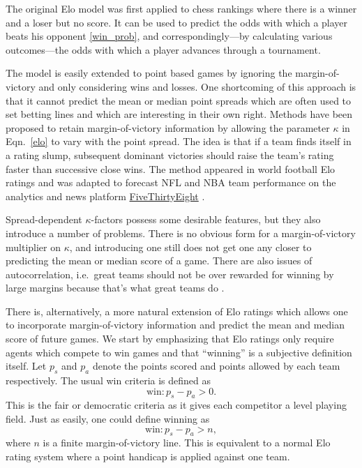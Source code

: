 \documentclass[aps,prc,reprint,amsmath,superscriptaddress]{revtex4-1}
\begin{document}
The original Elo model was first applied to chess rankings where there is a winner and a loser but no score.
It can be used to predict the odds with which a player beats his opponent \eqref{win_prob}, and correspondingly---by calculating various outcomes---the odds with which a player advances through a tournament. 

The model is easily extended to point based games by ignoring the margin-of-victory and only considering wins and losses.
One shortcoming of this approach is that it cannot predict the mean or median point spreads which are often used to set betting lines and which are interesting in their own right.
Methods have been proposed to retain margin-of-victory information by allowing the parameter $\kappa$ in Eqn.~\eqref{elo} to vary with the point spread.
The idea is that if a team finds itself in a rating slump, subsequent dominant victories should raise the team's rating faster than successive close wins.
The method appeared in world football Elo ratings \cite{footballratings} and was adapted to forecast NFL and NBA team performance on the analytics and news platform \href{www.fivethirtyeight.com}{FiveThirtyEight} \cite{538NFL, 538NBA}.

Spread-dependent $\kappa$-factors possess some desirable features, but they also introduce a number of problems.
There is no obvious form for a margin-of-victory multiplier on $\kappa$, and introducing one still does not get one any closer to predicting the mean or median score of a game.
There are also issues of autocorrelation, i.e.\ great teams should not be over rewarded for winning by large margins because that's what great teams do \cite{538NFL}.

There is, alternatively, a more natural extension of Elo ratings which allows one to incorporate margin-of-victory information and predict the mean and median score of future games.
We start by emphasizing that Elo ratings only require agents which compete to win games and that ``winning'' is a subjective definition itself.
Let $p_s$ and $p_a$ denote the points scored and points allowed by each team respectively.
The usual win criteria is defined as
\begin{equation}
  \text{win}: p_s - p_a > 0.
\end{equation}
This is the fair or democratic criteria as it gives each competitor a level playing field.
Just as easily, one could define winning as
\begin{equation}
  \text{win}: p_s - p_a > n,
\end{equation}
where $n$ is a finite margin-of-victory line.
This is equivalent to a normal Elo rating system where a point handicap is applied against one team.
\end{document}

